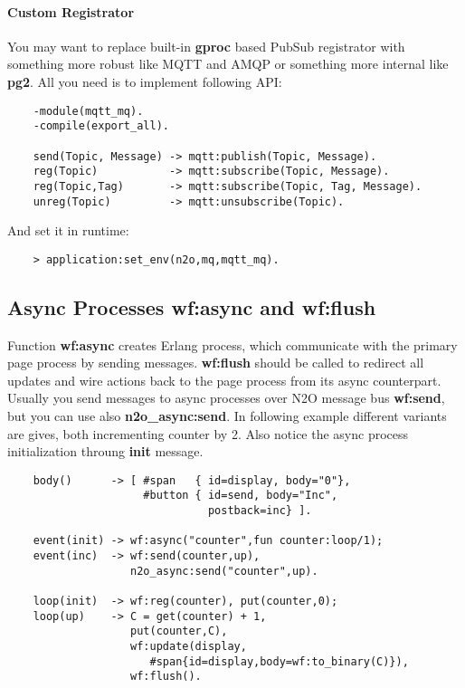 \paragraph{\bf Custom Registrator}

You may want to replace built-in {\bf gproc} based PubSub registrator
with something more robust like MQTT and AMQP or something more
internal like {\bf pg2}. All you need is to implement following API:

\vspace{1\baselineskip}
\begin{lstlisting}
    -module(mqtt_mq).
    -compile(export_all).

    send(Topic, Message) -> mqtt:publish(Topic, Message).
    reg(Topic)           -> mqtt:subscribe(Topic, Message).
    reg(Topic,Tag)       -> mqtt:subscribe(Topic, Tag, Message).
    unreg(Topic)         -> mqtt:unsubscribe(Topic).
\end{lstlisting}
\vspace{1\baselineskip}

And set it in runtime:

\vspace{1\baselineskip}
\begin{lstlisting}
    > application:set_env(n2o,mq,mqtt_mq).
\end{lstlisting}

\subsection{Async Processes {\bf wf:async} and {\bf wf:flush}}
Function {\bf wf:async} creates Erlang process, which communicate with the primary page
process by sending messages. {\bf wf:flush} should be called to redirect all updates and
wire actions back to the page process from its async counterpart.
Usually you send messages to async processes over N2O
message bus {\bf wf:send}, but you can use also {\bf n2o\_async:send}. In following
example different variants are gives, both incrementing counter by 2. Also notice
the async process initialization throung {\bf init} message.

\vspace{1\baselineskip}
\begin{lstlisting}
    body()      -> [ #span   { id=display, body="0"},
                     #button { id=send, body="Inc",
                               postback=inc} ].

    event(init) -> wf:async("counter",fun counter:loop/1);
    event(inc)  -> wf:send(counter,up),
                   n2o_async:send("counter",up).

    loop(init)  -> wf:reg(counter), put(counter,0);
    loop(up)    -> C = get(counter) + 1,
                   put(counter,C),
                   wf:update(display,
                      #span{id=display,body=wf:to_binary(C)}),
                   wf:flush().
\end{lstlisting}

